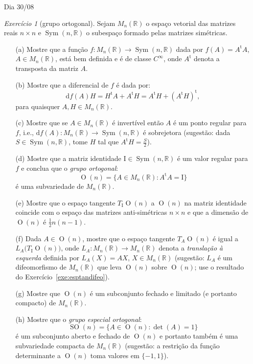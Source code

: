 \documentclass[oneside,11pt]{amsart}
\newcommand{\R}{\mathds R}
\newcommand{\dd}{\mathrm d}
\newcommand{\I}{\mathrm I}
\newcommand{\transp}{\mathrm t}
\DeclareMathOperator{\Sym}{Sym}
\DeclareMathOperator{\Or}{O}
\DeclareMathOperator{\SO}{SO}
\theoremstyle{remark}\newtheorem{exercise}{Exercício}[section]
\theoremstyle{plain}\newtheorem{teo}{Teorema}[section]
\theoremstyle{plain}\newtheorem{lem}[teo]{Lema}
\theoremstyle{plain}\newtheorem{prop}[teo]{Proposição}
\theoremstyle{definition}\newtheorem{defin}[teo]{Definição}
\theoremstyle{remark}\newtheorem{rem}[teo]{Observação}
\theoremstyle{definition}\newtheorem{example}[teo]{Exemplo}
\numberwithin{equation}{section}
\begin{document}
\begin{section}{Dia 30/08}

\begin{exercise}[grupo ortogonal]\label{exe:On}
Sejam $M_n(\R)$ o espaço vetorial das matrizes reais $n\times n$ e $\Sym(n,\R)$ o subespaço formado pelas matrizes simétricas.
\begin{itemize}
\item[(a)] Mostre que a função $f:M_n(\R)\to\Sym(n,\R)$ dada por $f(A)=A^\transp A$, $A\in M_n(\R)$, está bem definida e é de classe
$C^\infty$, onde $A^\transp$ denota a transposta da matriz $A$.
\item[(b)] Mostre que a diferencial de $f$ é dada por:
\[\dd f(A)H=H^\transp A+A^\transp H=A^\transp H+(A^\transp H)^\transp,\]
para quaisquer $A,H\in M_n(\R)$.
\item[(c)] Mostre que se $A\in M_n(\R)$ é invertível então $A$ é um ponto regular para $f$, i.e., $\dd f(A):M_n(\R)\to\Sym(n,\R)$ é sobrejetora
(sugestão: dada $S\in\Sym(n,\R)$, tome $H$ tal que $A^\transp H=\frac S2$).
\item[(d)] Mostre que a matriz identidade $\I\in\Sym(n,\R)$ é um valor regular para $f$ e conclua que o {\em grupo ortogonal}:
\[\Or(n)=\big\{A\in M_n(\R):A^\transp A=\I\big\}\]
é uma subvariedade de $M_n(\R)$.
\item[(e)] Mostre que o espaço tangente $T_\I\!\Or(n)$ a $\Or(n)$ na matriz identidade coincide com o espaço das matrizes anti-simétricas $n\times n$
e que a dimensão de $\Or(n)$ é $\frac12n(n-1)$.
\item[(f)] Dada $A\in\Or(n)$, mostre que o espaço tangente $T_A\!\Or(n)$ é igual a $L_A\big(T_\I\!\Or(n)\big)$, onde $L_A:M_n(\R)\to M_n(\R)$ denota
a {\em translação à esquerda\/} definida por $L_A(X)=AX$, $X\in M_n(\R)$ (sugestão: $L_A$ é um difeomorfismo de $M_n(\R)$ que leva $\Or(n)$ sobre
$\Or(n)$; use o resultado do Exercício~\ref{exe:esptandifeo}).
\item[(g)] Mostre que $\Or(n)$ é um subconjunto fechado e limitado (e portanto compacto) de $M_n(\R)$.
\item[(h)] Mostre que o {\em grupo especial ortogonal}:
\[\SO(n)=\big\{A\in\Or(n):\det(A)=1\big\}\]
é um subconjunto aberto e fechado de $\Or(n)$ e portanto também é uma subvariedade compacta de $M_n(\R)$ (sugestão: a restrição da função determinante
a $\Or(n)$ toma valores em $\{-1,1\}$).
\end{itemize}
\end{exercise}


\end{section}
\end{document}
